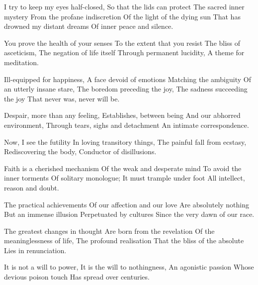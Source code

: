 \documentclass{article}
\newenvironment{stanza}{\begin{minipage}{10cm}\obeylines}{\end{minipage}\vspace{\baselineskip}}
\begin{document}
\begin{stanza}
I try to keep my eyes half-closed,
So that the lids can protect
The sacred inner mystery
From the profane indiscretion
Of the light of the dying sun
That has drowned my distant dreams
Of inner peace and silence.
\end{stanza}

\begin{stanza}
You prove the health of your senses
To the extent that you resist
The bliss of asceticism,
The negation of life itself
Through permanent lucidity,
A theme for meditation.
\end{stanza}

\begin{stanza}
Ill-equipped for happiness,
A face devoid of emotions
Matching the ambiguity
Of an utterly insane stare,
The boredom preceding the joy,
The sadness succeeding the joy
That never was, never will be.
\end{stanza}

\begin{stanza}
Despair, more than any feeling,
Establishes, between being
And our abhorred environment,
Through tears, sighs and detachment
An intimate correspondence.
\end{stanza}

\begin{stanza}
Now, I see the futility
In loving transitory things,
The painful fall from ecstasy,
Rediscovering the body,
Conductor of disillusions.
\end{stanza}

\begin{stanza}
Faith is a cherished mechanism
Of the weak and desperate mind
To avoid the inner torments
Of solitary monologue;
It must trample under foot
All intellect, reason and doubt.
\end{stanza}

\begin{stanza}
The practical achievements
Of our affection and our love
Are absolutely nothing
But an immense illusion
Perpetuated by cultures
Since the very dawn of our race.
\end{stanza}

\begin{stanza}
The greatest changes in thought
Are born from the revelation
Of the meaninglessness of life,
The profound realisation
That the bliss of the absolute
Lies in renunciation.
\end{stanza}

\begin{stanza}
It is not a will to power,
It is the will to nothingness,
An agonistic passion
Whose devious poison touch
Has spread over centuries.
\end{stanza}
\end{document}
